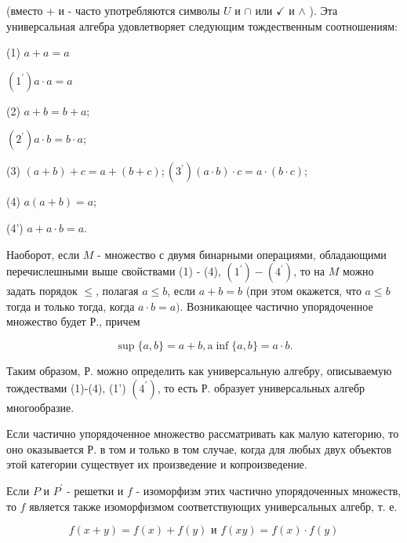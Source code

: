 \documentclass[10pt]{article}
\begin{document}
(вместо + и - часто употребляются символы $U$ и $\cap$ или $\checkmark$ и $\wedge$ ). Эта универсальная алгебра удовлетворяет следующим тождественным соотношениям:



(1) $a+a=a$



$\left(1^{\prime}\right) a \cdot a=a$



(2) $a+b=b+a$;



$\left(2^{\prime}\right) a \cdot b=b \cdot a$;



(3) $(a+b)+c=a+(b+c) ;\left(3^{\prime}\right)(a \cdot b) \cdot c=a \cdot(b \cdot c)$;



(4) $a(a+b)=a$;



(4') $a+a \cdot b=a$.



Наоборот, если $M$ - множество с двумя бинарными операциями, обладающими перечислешными выше свойствами (1) - (4), $\left(1^{\prime}\right)-\left(4^{\prime}\right)$, то на $M$ можно задать порядок $\leqslant$, полагая $a \leqslant b$, если $a+b=b$ (при этом окажется, что $a \leqslant b$ тогда и только тогда, когда $a \cdot b=a)$. Возникающее частично упорядоченное множество будет Р., причем



\[

\sup \{a, b\}=a+b, \mathrm{a} \inf \{a, b\}=a \cdot b .

\]



Таким образом, Р. можно определить как универсальную алгебру, описываемую тождествами (1)-(4), (1') $\left(4^{\prime}\right)$, то есть Р. образует универсальных алгебр многообразие.



Если частично упорядоченное множество рассматривать как малую категорию, то оно оказывается Р. в том и только в том случае, когда для любых двух объектов этой категории существует их произведение и копроизведение.



Если $P$ и $P^{\prime}$ - решетки и $f$ - изоморфизм этих частично упорядоченных множеств, то $f$ является также изоморфизмом соответствующих универсальных алгебр, т. е.



\[

f(x+y)=f(x)+f(y) \text { и } f(x y)=f(x) \cdot f(y)

\]
\end{document}
